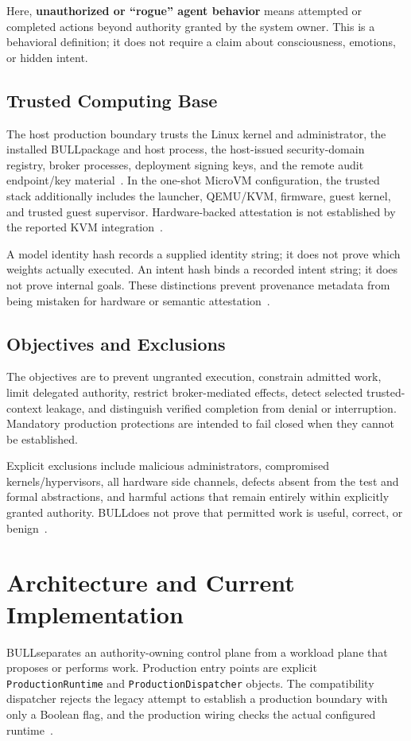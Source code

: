 \documentclass[journal]{IEEEtran}
\newcommand{\bull}{\textsc{BULL}}
\begin{document}
Here, \textbf{unauthorized or ``rogue'' agent behavior} means attempted or completed actions beyond authority granted by the system owner. This is a behavioral definition; it does not require a claim about consciousness, emotions, or hidden intent.

\subsection{Trusted Computing Base}
The host production boundary trusts the Linux kernel and administrator, the installed \bull package and host process, the host-issued security-domain registry, broker processes, deployment signing keys, and the remote audit endpoint/key material~\cite{BULL_ProdSec}. In the one-shot MicroVM configuration, the trusted stack additionally includes the launcher, QEMU/KVM, firmware, guest kernel, and trusted guest supervisor. Hardware-backed attestation is not established by the reported KVM integration~\cite{BULL_MicroVMReport}.

A model identity hash records a supplied identity string; it does not prove which weights actually executed. An intent hash binds a recorded intent string; it does not prove internal goals. These distinctions prevent provenance metadata from being mistaken for hardware or semantic attestation~\cite{BULL_SecurityDomain}.

\subsection{Objectives and Exclusions}
The objectives are to prevent ungranted execution, constrain admitted work, limit delegated authority, restrict broker-mediated effects, detect selected trusted-context leakage, and distinguish verified completion from denial or interruption. Mandatory production protections are intended to fail closed when they cannot be established.

Explicit exclusions include malicious administrators, compromised kernels/hypervisors, all hardware side channels, defects absent from the test and formal abstractions, and harmful actions that remain entirely within explicitly granted authority. \bull does not prove that permitted work is useful, correct, or benign~\cite{BULL_ProdSec}.

\section{Architecture and Current Implementation}
\bull separates an authority-owning control plane from a workload plane that proposes or performs work. Production entry points are explicit \texttt{ProductionRuntime} and \texttt{ProductionDispatcher} objects. The compatibility dispatcher rejects the legacy attempt to establish a production boundary with only a Boolean flag, and the production wiring checks the actual configured runtime~\cite{BULL_Dispatcher}.
\end{document}
